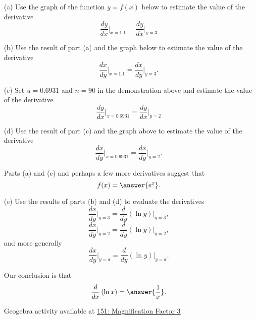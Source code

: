 \documentclass{ximera}
\begin{document}
\begin{example}   \label{Ex:LDfjbbrt}

(a) Use the graph of the function $y=f(x)$ below to estimate the value of the derivative
\[
    \frac{dy}{dx}\Big|_{x=1.1} =  \frac{dy}{dx}\Big|_{y=3}
\]

(b) Use the result of part (a) and the graph below to estimate the value of the derivative 
\[
      \frac{dx}{dy}\Big|_{x=1.1} = \frac{dx}{dy}\Big|_{y=3} .
\]

\begin{onlineOnly}
    \begin{center}
\end{center}
\end{onlineOnly}

(c) Set $u=0.6931$ and $n=90$ in the demonstration above and estimate the value of the derivative
\[
    \frac{dy}{dx}\Big|_{x=0.6931} = \frac{dy}{dx}\Big|_{y=2}
\]

(d) Use the result of part (c) and the graph above to estimate the value of the derivative 
\[
      \frac{dx}{dy}\Big|_{x=0.6931} = \frac{dx}{dy}\Big|_{y=2} .
\]

\begin{question}  \label{Q:dfrr4f}
Parts (a) and (c) and perhaps a few more derivatives suggest that
\[
     f(x) = \answer{e^x} .
\]
\end{question}

(e) Use the results of parts (b) and (d) to evaluate the derivatives
\[
         \frac{dx}{dy}\Big|_{y=3} = \frac{d}{dy}\left(  \ln y  \right)\Big|_{y=3} ,
\]
\[
         \frac{dx}{dy}\Big|_{y=2} = \frac{d}{dy}\left(  \ln y  \right)\Big|_{y=2}  ,
\]
and more generally
\[
             \frac{dx}{dy}\Big|_{y=a} = \frac{d}{dy}\left(  \ln y  \right)\Big|_{y=a} . 
\]


\begin{question}  \label{Q:Dfdsfgt4gg}
Our conclusion is that
\[
   \frac{d}{dx} \left(  \ln x \right) = \answer{\frac{1}{x}} . 
\]
\end{question}

Geogebra activity available at \href{https://www.desmos.com/calculator/nnshzdh6jp}{151: Magnification Factor 3}

\end{example}
\end{document}
